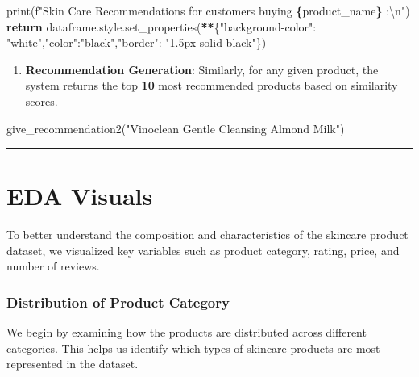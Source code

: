\documentclass[
]{article}
\newenvironment{Shaded}{\begin{snugshade}}{\end{snugshade}}
\newcommand{\BuiltInTok}[1]{#1}
\newcommand{\CharTok}[1]{\textcolor[rgb]{0.31,0.60,0.02}{#1}}
\newcommand{\ControlFlowTok}[1]{\textcolor[rgb]{0.13,0.29,0.53}{\textbf{#1}}}
\newcommand{\NormalTok}[1]{#1}
\newcommand{\OperatorTok}[1]{\textcolor[rgb]{0.81,0.36,0.00}{\textbf{#1}}}
\newcommand{\SpecialCharTok}[1]{\textcolor[rgb]{0.81,0.36,0.00}{\textbf{#1}}}
\newcommand{\SpecialStringTok}[1]{\textcolor[rgb]{0.31,0.60,0.02}{#1}}
\newcommand{\StringTok}[1]{\textcolor[rgb]{0.31,0.60,0.02}{#1}}
\providecommand{\tightlist}{%
  \setlength{\itemsep}{0pt}\setlength{\parskip}{0pt}}
\begin{document}
\begin{Shaded}
\begin{Highlighting}[]
    \BuiltInTok{print}\NormalTok{(}\SpecialStringTok{f"Skin Care Recommendations for customers buying }\SpecialCharTok{\{}\NormalTok{product\_name}\SpecialCharTok{\}}\SpecialStringTok{ :}\CharTok{\textbackslash{}n}\SpecialStringTok{"}\NormalTok{)}
    \ControlFlowTok{return}\NormalTok{ dataframe.style.set\_properties(}\OperatorTok{**}\NormalTok{\{}\StringTok{"background{-}color"}\NormalTok{: }\StringTok{"white"}\NormalTok{,}\StringTok{"color"}\NormalTok{:}\StringTok{"black"}\NormalTok{,}\StringTok{"border"}\NormalTok{: }\StringTok{"1.5px  solid black"}\NormalTok{\})}
\end{Highlighting}
\end{Shaded}

\begin{enumerate}
\def\labelenumi{\arabic{enumi}.}
\setcounter{enumi}{2}
\tightlist
\item
  \textbf{Recommendation Generation}: Similarly, for any given product,
  the system returns the top \textbf{10} most recommended products based
  on similarity scores.
\end{enumerate}

\begin{Shaded}
\begin{Highlighting}[]
\NormalTok{give\_recommendation2(}\StringTok{"Vinoclean Gentle Cleansing Almond Milk"}\NormalTok{)}
\end{Highlighting}
\end{Shaded}

\begin{center}\rule{0.5\linewidth}{0.5pt}\end{center}

\section{EDA Visuals}\label{eda-visuals}

To better understand the composition and characteristics of the skincare
product dataset, we visualized key variables such as product category,
rating, price, and number of reviews.

\subsubsection{Distribution of Product
Category}\label{distribution-of-product-category}

We begin by examining how the products are distributed across different
categories. This helps us identify which types of skincare products are
most represented in the dataset.
\end{document}
